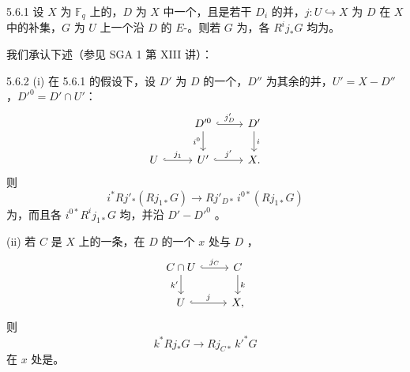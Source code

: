 \begin{SGAresult}{}{5.6.1}
设 $X$ 为 $\mathbb F_q$ 上的，$D$ 为 $X$ 中一个，且是若干 $D_i$ 的并，$j:U\hookrightarrow X$ 为 $D$ 在 $X$ 中的补集，$G$ 为 $U$ 上一个沿 $D$ 的 $E$-。则若 $G$ 为，各 $R^ij_*G$ 均为。
\end{SGAresult}

我们承认下述（参见 SGA 1 第 XIII 讲）：

\begin{SGAresult}{}{5.6.2}
\textup{(i)} 在 5.6.1 的假设下，设 $D'$ 为 $D$ 的一个，$D''$ 为其余的并，$U'=X-D''$，$D'^0=D'\cap U'$：
\[
\begin{tikzcd}
&D'^0\arrow[r,hook,"j'_D"]\arrow[d,"i^0"']&D'\arrow[d,"i"]\\
U\arrow[r,hook,"j_1"]&U'\arrow[r,hook,"j'"]&X.
\end{tikzcd}
\]
则
\[
i^*Rj'_*(Rj_{1*}G)\longrightarrow Rj'_{D*}\,i^{0*}(Rj_{1*}G)
\]
为，而且各 $i^{0*}R^ij_{1*}G$ 均，并沿 $D'-D'^0$ 。

\textup{(ii)} 若 $C$ 是 $X$ 上的一条，在 $D$ 的一个 $x$ 处与 $D$ ，
\[
\begin{tikzcd}
C\cap U\arrow[r,hook,"j_C"]\arrow[d,"k'"']&C\arrow[d,"k"]\\
U\arrow[r,hook,"j"]&X,
\end{tikzcd}
\]
则
\[
k^*Rj_*G\longrightarrow Rj_{C*}\,k'^*G
\]
在 $x$ 处是。
\end{SGAresult}
